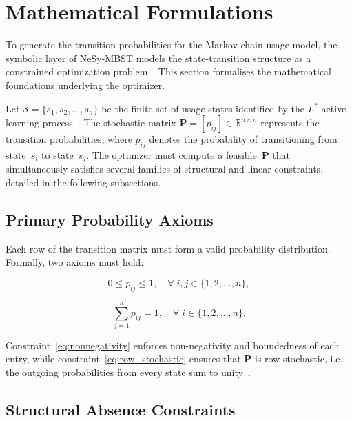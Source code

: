 \section{Mathematical Formulations}%
\label{sec:mathematical_formulations}

To generate the transition probabilities for the Markov chain usage model, the symbolic layer of NeSy-MBST models the state-transition structure as a constrained optimization problem~\cite{whittaker1993markov, boehr_constraints}. This section formalises the mathematical foundations underlying the optimizer.

Let $\mathcal{S} = \{s_1, s_2, \dots, s_n\}$ be the finite set of usage states identified by the $L^{*}$ active learning process~\cite{lstar_llm}. The stochastic matrix $\mathbf{P} = [p_{ij}] \in \mathbb{R}^{n \times n}$ represents the transition probabilities, where $p_{ij}$ denotes the probability of transitioning from state~$s_i$ to state~$s_j$. The optimizer must compute a feasible~$\mathbf{P}$ that simultaneously satisfies several families of structural and linear constraints, detailed in the following subsections.

\subsection{Primary Probability Axioms}%
\label{subsec:probability_axioms}

Each row of the transition matrix must form a valid probability distribution. Formally, two axioms must hold:

\begin{equation}
\label{eq:nonnegativity}
0 \leq p_{ij} \leq 1, \quad \forall\; i,j \in \{1, 2, \dots, n\},
\end{equation}

\begin{equation}
\label{eq:row_stochastic}
\sum_{j=1}^{n} p_{ij} = 1, \quad \forall\; i \in \{1, 2, \dots, n\}.
\end{equation}

Constraint~\eqref{eq:nonnegativity} enforces non-negativity and boundedness of each entry, while constraint~\eqref{eq:row_stochastic} ensures that $\mathbf{P}$ is row-stochastic, i.e., the outgoing probabilities from every state sum to unity~\cite{nap_statistics}.

\subsection{Structural Absence Constraints}%
\label{subsec:structural_constraints}

